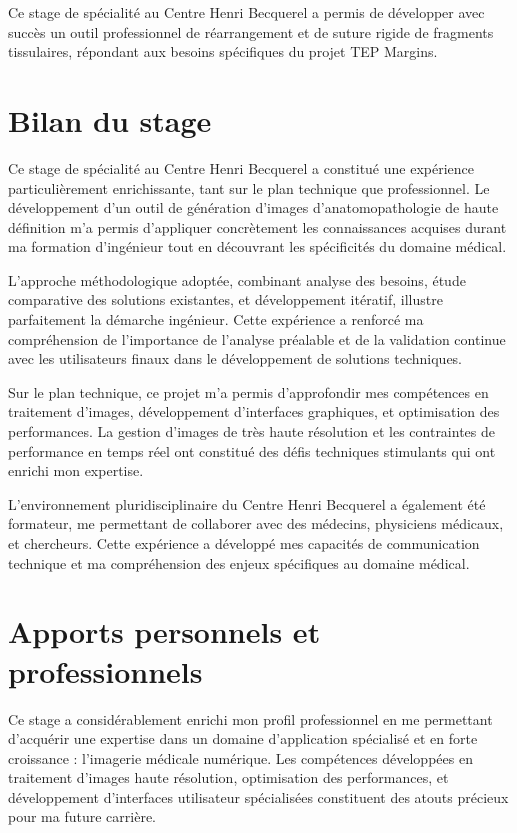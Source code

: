 \documentclass[12pt,a4paper]{report}
\begin{document}
\begin{center}
Ce stage de spécialité au Centre Henri Becquerel a permis de développer avec succès un outil professionnel de réarrangement et de suture rigide de fragments tissulaires, répondant aux besoins spécifiques du projet TEP Margins.
\end{center}

\vspace{1em}

\section{Bilan du stage}

Ce stage de spécialité au Centre Henri Becquerel a constitué une expérience particulièrement enrichissante, tant sur le plan technique que professionnel. Le développement d'un outil de génération d'images d'anatomopathologie de haute définition m'a permis d'appliquer concrètement les connaissances acquises durant ma formation d'ingénieur tout en découvrant les spécificités du domaine médical.

L'approche méthodologique adoptée, combinant analyse des besoins, étude comparative des solutions existantes, et développement itératif, illustre parfaitement la démarche ingénieur. Cette expérience a renforcé ma compréhension de l'importance de l'analyse préalable et de la validation continue avec les utilisateurs finaux dans le développement de solutions techniques.

Sur le plan technique, ce projet m'a permis d'approfondir mes compétences en traitement d'images, développement d'interfaces graphiques, et optimisation des performances. La gestion d'images de très haute résolution et les contraintes de performance en temps réel ont constitué des défis techniques stimulants qui ont enrichi mon expertise.

L'environnement pluridisciplinaire du Centre Henri Becquerel a également été formateur, me permettant de collaborer avec des médecins, physiciens médicaux, et chercheurs. Cette expérience a développé mes capacités de communication technique et ma compréhension des enjeux spécifiques au domaine médical.

\section{Apports personnels et professionnels}

Ce stage a considérablement enrichi mon profil professionnel en me permettant d'acquérir une expertise dans un domaine d'application spécialisé et en forte croissance : l'imagerie médicale numérique. Les compétences développées en traitement d'images haute résolution, optimisation des performances, et développement d'interfaces utilisateur spécialisées constituent des atouts précieux pour ma future carrière.
\end{document}
